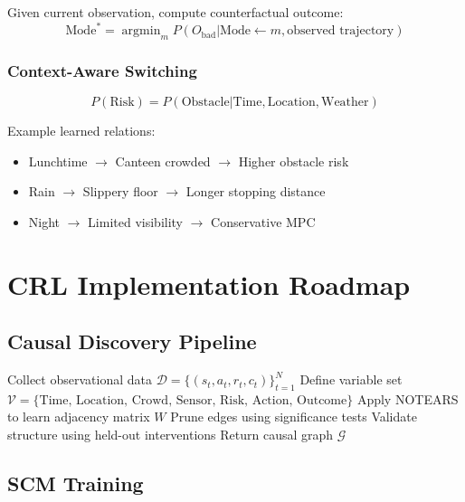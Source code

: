 \documentclass[11pt,a4paper]{article}
\newcommand{\argmin}{\operatorname{argmin}}
\begin{document}
Given current observation, compute counterfactual outcome:
\begin{equation}
  \text{Mode}^* = \argmin_m P(O_{\text{bad}} | \text{Mode} \leftarrow m, \text{observed trajectory})
\end{equation}

\subsubsection{Context-Aware Switching}

\begin{equation}
  P(\text{Risk}) = P(\text{Obstacle}|\text{Time}, \text{Location}, \text{Weather})
\end{equation}

Example learned relations:
\begin{itemize}
  \item Lunchtime $\rightarrow$ Canteen crowded $\rightarrow$ Higher obstacle risk
  \item Rain $\rightarrow$ Slippery floor $\rightarrow$ Longer stopping distance
  \item Night $\rightarrow$ Limited visibility $\rightarrow$ Conservative MPC
\end{itemize}

\section{CRL Implementation Roadmap}

\subsection{Causal Discovery Pipeline}

\begin{algorithm}[H]
\caption{Causal Discovery for Navigation SCM}
\begin{algorithmic}[1]
\State Collect observational data $\mathcal{D} = \{(s_t, a_t, r_t, c_t)\}_{t=1}^N$
\State Define variable set $\mathcal{V} = \{\text{Time, Location, Crowd, Sensor, Risk, Action, Outcome}\}$
\State Apply NOTEARS to learn adjacency matrix $W$
\State Prune edges using significance tests
\State Validate structure using held-out interventions
\State Return causal graph $\mathcal{G}$
\end{algorithmic}
\end{algorithm}

\subsection{SCM Training}
\end{document}
